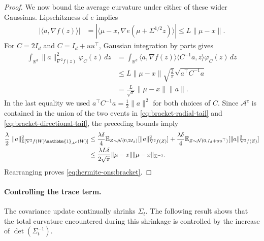 \documentclass{article}
\theoremstyle{plain}
\theoremstyle{definition}
\theoremstyle{plain}
\newcommand{\R}{\mathbb R}
\newcommand{\E}{\mathbb E}
\newcommand{\cN}{\mathcal N}
\begin{document}
\begin{proof}
    We now bound the average curvature under either of these wider
    Gaussians. Lipschitzness of $e$ implies
    \begin{align}
        |\langle a,\nabla f(z)\rangle|
         & =
        |\langle\mu-x,
        \nabla e(\mu+\Sigma^{1/2}z)\rangle|
        \leq
        L\|\mu-x\|.
        \label{eq:bracket-directional-lipschitz}
    \end{align}
    For $C=2I_d$ and $C=I_d+uu^\top$, Gaussian integration by parts gives
    \begin{align}
        \int_{\R^d}
        \|a\|_{\nabla^2f(z)}^2
        \varphi_C(z)\,dz
         & =
        \int_{\R^d}
        \langle a,\nabla f(z)\rangle
        \langle C^{-1}a,z\rangle
        \varphi_C(z)\,dz
        \nonumber \\
         & \leq
        L\|\mu-x\|
        \sqrt{\frac{2}{\pi}}
        \sqrt{a^\top C^{-1}a}
        \nonumber \\
         & =
        \frac{L}{\sqrt\pi}
        \|\mu-x\|\|a\|.
        \label{eq:bracket-tail-curvature}
    \end{align}
    In the last equality we used $a^\top C^{-1}a=\frac12\|a\|^2$ for both choices of $C$.
    Since $\mathcal A^c$ is contained in the union of the two events
    in \eqref{eq:bracket-radial-tail} and
    \eqref{eq:bracket-directional-tail}, the preceding bounds imply
    \begin{align}
        \frac{\lambda}{2}\ \|a\|_{\E[\nabla^2f(W) \mathbbm{1}_{\mathcal A^c}(W)]}^2
         & \leq
        \frac{\lambda \delta}{4} \E_{Z\sim\cN(0,2I_d)}[\|a\|_{\nabla^2f(Z)}^2]
        +
        \frac{\lambda \delta}{4} \E_{Z\sim\cN(0,I_d+uu^\top)}[\|a\|_{\nabla^2f(Z)}^2]
        \nonumber \\
         & \leq
        \frac{\lambda L\delta}{2\sqrt{\pi}}
        \|\mu-x\|
        \|\mu-x\|_{\Sigma^{-1}}.
        \label{eq:bracket-outside-set}
    \end{align}
    Rearranging proves \eqref{eq:hermite-ons:bracket}.
\end{proof}

\paragraph{Controlling the trace term.}
The covariance update continually shrinks $\Sigma_t$. The following
result shows that the total curvature encountered during this shrinkage
is controlled by the increase of $\det(\Sigma_t^{-1})$.
\end{document}
